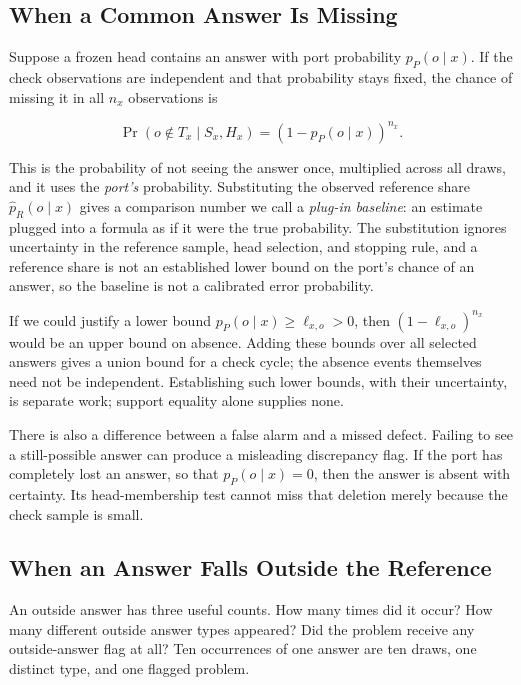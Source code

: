 \documentclass[10pt,letterpaper]{article}
\begin{document}
\subsection{When a Common Answer Is Missing}\label{sec:absence}

Suppose a frozen head contains an answer with port probability \(p_P(o\mid x)\). If the
check observations are independent and that probability stays fixed, the chance of missing
it in all \(n_x\) observations is

\[
\Pr(o\notin T_x\mid S_x,H_x)=(1-p_P(o\mid x))^{n_x}.
\]

This is the probability of not seeing the answer once, multiplied across all draws, and it
uses the \emph{port's} probability. Substituting the observed reference share
\(\widehat p_R(o\mid x)\) gives a comparison number we call a \emph{plug-in baseline}: an
estimate plugged into a formula as if it were the true probability. The substitution
ignores uncertainty in the reference sample, head selection, and stopping rule, and a
reference share is not an established lower bound on the port's chance of an answer, so
the baseline is not a calibrated error probability.

If we could justify a lower bound \(p_P(o\mid x)\ge\ell_{x,o}>0\), then
\((1-\ell_{x,o})^{n_x}\) would be an upper bound on absence. Adding these bounds over all
selected answers gives a union bound for a check cycle; the absence events themselves need
not be independent. Establishing such lower bounds, with their uncertainty, is separate
work; support equality alone supplies none.

There is also a difference between a false alarm and a missed defect. Failing to see a
still-possible answer can produce a misleading discrepancy flag. If the port has
completely lost an answer, so that \(p_P(o\mid x)=0\), then the answer is absent with
certainty. Its head-membership test cannot miss that deletion merely because the check
sample is small.

\subsection{When an Answer Falls Outside the Reference}\label{sec:novelty}

An outside answer has three useful counts. How many times did it occur? How many different
outside answer types appeared? Did the problem receive any outside-answer flag at all? Ten
occurrences of one answer are ten draws, one distinct type, and one flagged problem.
\end{document}
